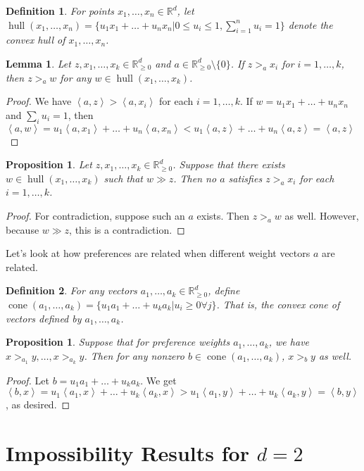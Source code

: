 \documentclass[12pt]{article}
\newtheorem*{definition}{Definition}
\newtheorem{proposition}[theorem]{Proposition}
\newtheorem{lemma}[theorem]{Lemma}
\newcommand{\R}{\mathbb{R}}
\newcommand{\Rgz}{\mathbb{R}_{\ge 0}}
\newcommand{\ip}[2]{\left\langle{#1},{#2}\right\rangle}
\DeclareMathOperator*{\cone}{cone}
\DeclareMathOperator*{\hull}{hull}
\newcommand{\1}[1]{\mathds{1}[{#1}]}
\begin{document}
  \begin{definition}
    For points $x_1,\ldots,x_n \in \R^d$, let $\hull(x_1,\ldots,x_n)
    = \{u_1x_1 + \ldots + u_nx_n | 0\le u_i\le 1, \sum_{i=1}^n u_i = 1\}$
    denote the convex hull of $x_1,\ldots,x_n$.
  \end{definition}
  \begin{lemma}
    Let $z,x_1,\ldots,x_k \in \Rgz^d$ and $a\in \Rgz^d \setminus \{0\}$.
    If $z >_a x_i$ for $i=1,\ldots,k$, then $z >_a w$
    for any $w\in \hull(x_1,\ldots,x_k)$.
  \end{lemma}
  \begin{proof}
    We have $\ip{a}{z} > \ip{a}{x_i}$ for each $i=1,\ldots,k$.
    If $w = u_1x_1+ \ldots + u_nx_n$ and $\sum_i u_i =1$, then
    $\ip{a}{w} = u_1\ip{a}{x_1}+\ldots+u_n\ip{a}{x_n}
    < u_1\ip{a}{z} + \ldots + u_n\ip{a}{z} = \ip{a}{z}$
  \end{proof}
  \begin{proposition}
    Let $z,x_1,\ldots,x_k \in \Rgz^d$.
    Suppose that there exists $w\in \hull(x_1,\ldots,x_k)$
    such that $w \gg z$.
    Then no $a$ satisfies $z >_a x_i$ for each $i=1,\ldots, k$.
  \end{proposition}
  \begin{proof}
    For contradiction, suppose such an $a$ exists.
    Then $z >_a w$ as well. However, because $w \gg z$,
    this is a contradiction.
  \end{proof}

  Let's look at how preferences are related when different weight vectors $a$
  are related.
  \begin{definition}
    For any vectors $a_1,\ldots, a_k \in \Rgz^d$, define
    $\cone(a_1,\ldots,a_k) = \{ u_1a_1 + \ldots + u_ka_k | u_i\ge 0 \forall j\}$.
    That is, the convex cone of vectors defined by $a_1,\ldots,a_k$.
  \end{definition}
  \begin{proposition}
    Suppose that for preference weights $a_1,\ldots, a_k$,
    we have $x >_{a_1} y, \ldots, x >_{a_k} y$.
    Then for any nonzero $b\in \cone(a_1,\ldots, a_k)$,
    $x >_b y$ as well.
  \end{proposition}
  \begin{proof}
    Let $b = u_1a_1+ \ldots + u_ka_k$.
    We get $\ip{b}{x} = u_1\ip{a_1}{x} + \ldots + u_k\ip{a_k}{x}
    > u_1\ip{a_1}{y} + \ldots + u_k\ip{a_k}{y} = \ip{b}{y}$,
    as desired.
  \end{proof}

\section{Impossibility Results for $d=2$}
\end{document}
